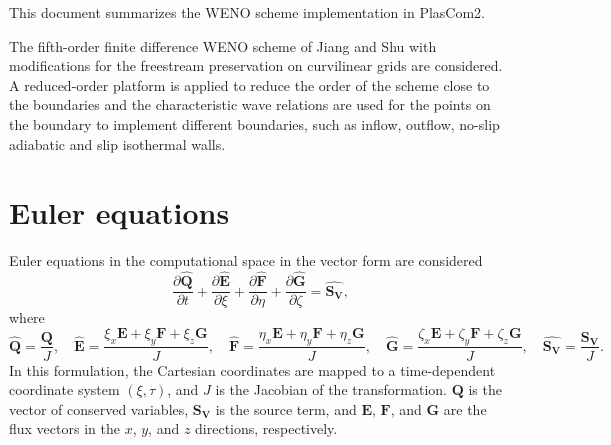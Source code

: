 This document summarizes the W\+E\+NO scheme implementation in Plas\+Com2.

The fifth-\/order finite difference W\+E\+NO scheme of Jiang and Shu \cite{Jiang1996:fifth} with modifications for the freestream preservation on curvilinear grids \cite{nonomura2015new} are considered. A reduced-\/order platform is applied to reduce the order of the scheme close to the boundaries and the characteristic wave relations are used for the points on the boundary to implement different boundaries, such as inflow, outflow, no-\/slip adiabatic and slip isothermal walls.\hypertarget{weno_gov}{}\section{Euler equations}\label{weno_gov}
Euler equations in the computational space in the vector form are considered \[ \begin{equation*} \frac{\partial \hat{\mathbf{Q}}}{\partial t}+\frac{\partial \hat{\mathbf{E}}}{\partial \xi}+\frac{\partial \hat{\mathbf{F}}}{\partial \eta}+\frac{\partial \hat{\mathbf{G}}}{\partial \zeta}=\hat{\mathbf{S_V}}, \end{equation*} \] where \[ \begin{equation*} \hat{\mathbf{Q}}=\frac{\mathbf{Q}}{J}, \quad \hat{\mathbf{E}}=\frac{\xi_x \mathbf{E} +\xi_y \mathbf{F} +\xi_z \mathbf{G}}{J}, \quad \hat{\mathbf{F}}=\frac{\eta_x \mathbf{E}+\eta_y \mathbf{F} +\eta_z \mathbf{G}}{J},\quad \hat{\mathbf{G}}=\frac{\zeta_x \mathbf{E}+\zeta_y \mathbf{F} +\zeta_z \mathbf{G}}{J}, \quad \hat{\mathbf{S_V}}=\frac{\mathbf{S_V}}{J}. \end{equation*} \] In this formulation, the Cartesian coordinates are mapped to a time-\/dependent coordinate system $(\xi, \tau)$, and $J$ is the Jacobian of the transformation. $\mathbf{Q}$ is the vector of conserved variables, $\mathbf{S_V}$ is the source term, and $\mathbf{E}$, $\mathbf{F}$, and $\mathbf{G}$ are the flux vectors in the $x$, $y$, and $z$ directions, respectively.

